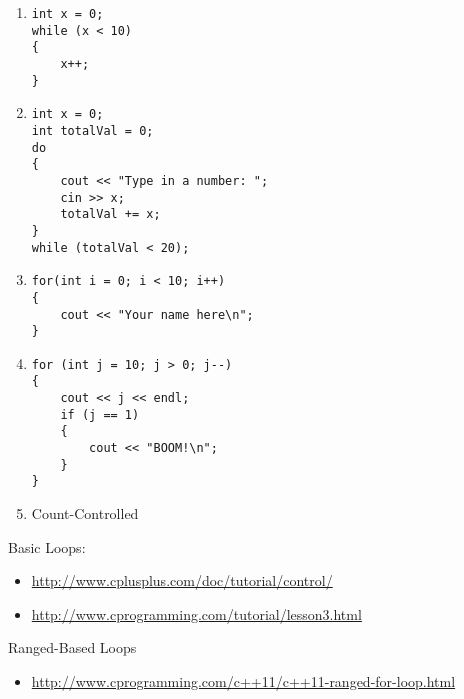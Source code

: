 \begin{enumerate}

\item
\noindent\begin{minipage}{\linewidth}\begin{lstlisting}
int x = 0;
while (x < 10)
{
	x++;
} 
\end{lstlisting}\end{minipage}

\item
\noindent\begin{minipage}{\linewidth}\begin{lstlisting}
int x = 0;
int totalVal = 0;
do
{
	cout << "Type in a number: "; 
	cin >> x;
	totalVal += x;
}
while (totalVal < 20); 
\end{lstlisting}\end{minipage}

\item 
\noindent\begin{minipage}{\linewidth}\begin{lstlisting}
for(int i = 0; i < 10; i++)
{
	cout << "Your name here\n";
}
\end{lstlisting}\end{minipage}

\item
\noindent\begin{minipage}{\linewidth}\begin{lstlisting}
for (int j = 10; j > 0; j--)
{
	cout << j << endl;
	if (j == 1)
	{
		cout << "BOOM!\n";
	}
}
\end{lstlisting}\end{minipage}

\item Count-Controlled

\end{enumerate}


Basic Loops:
\begin{itemize}
\item \url{http://www.cplusplus.com/doc/tutorial/control/}
\item \url{http://www.cprogramming.com/tutorial/lesson3.html}
\end{itemize}

\noindent Ranged-Based Loops
\begin{itemize}
\item \url{http://www.cprogramming.com/c++11/c++11-ranged-for-loop.html}
\end{itemize}


